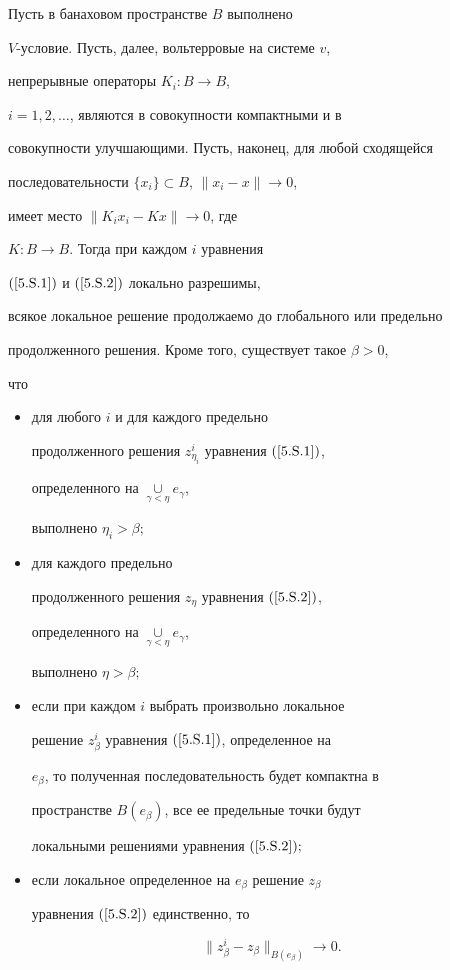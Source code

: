 \begin{thm}


Пусть в банаховом пространстве $B$ выполнено


$V$-условие. Пусть, далее, вольтерровые на системе $v$,


непрерывные операторы $K_{i}:B \to B$,


$i=1,2,\dotsc$, являются в совокупности компактными и в


совокупности улучшающими. Пусть, наконец, для любой сходящейся


последовательности $\{x_i\} \subset B$, $\|x_i -x\|\to0$,


имеет место $\|K_i x_i - K x\|\to 0$, где


$K:B \to B$. Тогда при каждом $i$ уравнения


$(\ref{5.S.1})$ и $(\ref{5.S.2})$ локально разрешимы,


всякое локальное решение продолжаемо до глобального или предельно


продолженного решения. Кроме того, существует такое $\beta>0$,


что


\begin{itemize}


\item[1)] для любого $i$ и для каждого предельно


продолженного решения $z_{\eta_i}^i$ уравнения $(\ref{5.S.1})$,


определенного на $\mathop{\cup}\limits_{\gamma<\eta}e_\gamma$,


выполнено $ \eta_i>\beta;$


\item[2)] для каждого предельно


продолженного решения $z_{\eta}$ уравнения $(\ref{5.S.2})$,


определенного на $\mathop{\cup}\limits_{\gamma<\eta}e_\gamma$,


выполнено $ \eta>\beta;$


\item[3)] если при каждом $i$ выбрать произвольно локальное


решение $z_{\beta}^i$ уравнения $(\ref{5.S.1})$, определенное на


$e_{\beta}$, то полученная последовательность будет компактна в


пространстве $B(e_{\beta})$, все ее предельные точки будут


локальными решениями уравнения $(\ref{5.S.2});$


\item[4)] если локальное определенное на $e_{\beta}$ решение $z_{\beta}$ 


уравнения $(\ref{5.S.2})$ единственно, то


$$


\|z_{\beta}^i -z_{\beta}\|_{B(e_{\beta})} \to 0.


$$


\end{itemize}


\end{thm}









